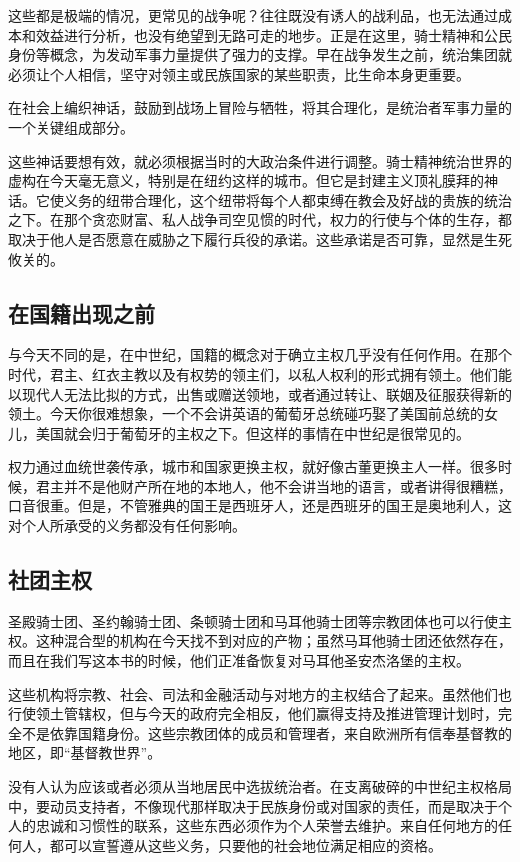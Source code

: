 这些都是极端的情况，更常见的战争呢？往往既没有诱人的战利品，也无法通过成本和效益进行分析，也没有绝望到无路可走的地步。正是在这里，骑士精神和公民身份等概念，为发动军事力量提供了强力的支撑。早在战争发生之前，统治集团就必须让个人相信，坚守对领主或民族国家的某些职责，比生命本身更重要。

在社会上编织神话，鼓励到战场上冒险与牺牲，将其合理化，是统治者军事力量的一个关键组成部分。

这些神话要想有效，就必须根据当时的大政治条件进行调整。骑士精神统治世界的虚构在今天毫无意义，特别是在纽约这样的城市。但它是封建主义顶礼膜拜的神话。它使义务的纽带合理化，这个纽带将每个人都束缚在教会及好战的贵族的统治之下。在那个贪恋财富、私人战争司空见惯的时代，权力的行使与个体的生存，都取决于他人是否愿意在威胁之下履行兵役的承诺。这些承诺是否可靠，显然是生死攸关的。

\subsection{在国籍出现之前}
与今天不同的是，在中世纪，国籍的概念对于确立主权几乎没有任何作用。在那个时代，君主、红衣主教以及有权势的领主们，以私人权利的形式拥有领土。他们能以现代人无法比拟的方式，出售或赠送领地，或者通过转让、联姻及征服获得新的领土。今天你很难想象，一个不会讲英语的葡萄牙总统碰巧娶了美国前总统的女儿，美国就会归于葡萄牙的主权之下。但这样的事情在中世纪是很常见的。

权力通过血统世袭传承，城市和国家更换主权，就好像古董更换主人一样。很多时候，君主并不是他财产所在地的本地人，他不会讲当地的语言，或者讲得很糟糕，口音很重。但是，不管雅典的国王是西班牙人，还是西班牙的国王是奥地利人，这对个人所承受的义务都没有任何影响。

\subsection{社团主权}
圣殿骑士团、圣约翰骑士团、条顿骑士团和马耳他骑士团等宗教团体也可以行使主权。这种混合型的机构在今天找不到对应的产物；虽然马耳他骑士团还依然存在，而且在我们写这本书的时候，他们正准备恢复对马耳他圣安杰洛堡的主权。

这些机构将宗教、社会、司法和金融活动与对地方的主权结合了起来。虽然他们也行使领土管辖权，但与今天的政府完全相反，他们赢得支持及推进管理计划时，完全不是依靠国籍身份。这些宗教团体的成员和管理者，来自欧洲所有信奉基督教的地区，即“基督教世界”。

没有人认为应该或者必须从当地居民中选拔统治者。在支离破碎的中世纪主权格局中，要动员支持者，不像现代那样取决于民族身份或对国家的责任，而是取决于个人的忠诚和习惯性的联系，这些东西必须作为个人荣誉去维护。来自任何地方的任何人，都可以宣誓遵从这些义务，只要他的社会地位满足相应的资格。

